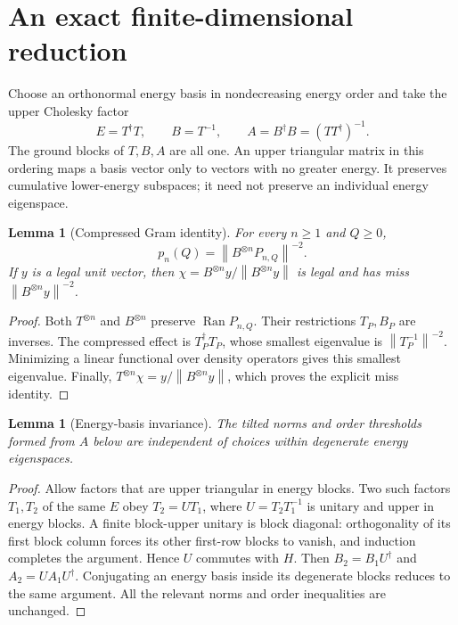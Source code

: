 \documentclass[11pt,a4paper]{article}
\newtheorem{lemma}[theorem]{Lemma}
\theoremstyle{remark}
\DeclareMathOperator{\Ran}{Ran}
\newcommand{\norm}[1]{\left\|#1\right\|}
\begin{document}
\section{An exact finite-dimensional reduction}
Choose an orthonormal energy basis in nondecreasing energy order and take
the upper Cholesky factor
\begin{equation}\label{eq:cholesky}
 E=T^\dagger T,\qquad B=T^{-1},\qquad
 A=B^\dagger B=(TT^\dagger)^{-1}.
\end{equation}
The ground blocks of \(T,B,A\) are all one. An upper triangular matrix in
this ordering maps a basis vector only to vectors with no greater energy.
It preserves cumulative lower-energy subspaces; it need not preserve an
individual energy eigenspace.

\begin{lemma}[Compressed Gram identity]\label{lem:gram}
For every \(n\geq1\) and \(Q\geq0\),
\begin{equation}\label{eq:gram}
 p_n(Q)=\norm{B^{\otimes n}P_{n,Q}}^{-2}.
\end{equation}
If \(y\) is a legal unit vector, then
\(\chi=B^{\otimes n}y/\norm{B^{\otimes n}y}\) is legal and has miss
\(\norm{B^{\otimes n}y}^{-2}\).
\end{lemma}
\begin{proof}
Both \(T^{\otimes n}\) and \(B^{\otimes n}\) preserve \(\Ran P_{n,Q}\).
Their restrictions \(T_P,B_P\) are inverses. The compressed effect is
\(T_P^\dagger T_P\), whose smallest eigenvalue is
\(\norm{T_P^{-1}}^{-2}\). Minimizing a linear functional over density
operators gives this smallest eigenvalue. Finally,
\(T^{\otimes n}\chi=y/\norm{B^{\otimes n}y}\), which proves the explicit
miss identity.
\end{proof}

\begin{lemma}[Energy-basis invariance]\label{lem:invariance}
The tilted norms and order thresholds formed from \(A\) below are
independent of choices within degenerate energy eigenspaces.
\end{lemma}
\begin{proof}
Allow factors that are upper triangular in energy blocks. Two such factors
\(T_1,T_2\) of the same \(E\) obey \(T_2=UT_1\), where
\(U=T_2T_1^{-1}\) is unitary and upper in energy blocks. A finite
block-upper unitary is block diagonal: orthogonality of its first block
column forces its other first-row blocks to vanish, and induction completes
the argument. Hence \(U\) commutes with \(H\).
Then \(B_2=B_1U^\dagger\) and \(A_2=UA_1U^\dagger\).
Conjugating an energy basis inside its degenerate blocks reduces to the
same argument. All the relevant norms and order inequalities are unchanged.
\end{proof}
\end{document}

